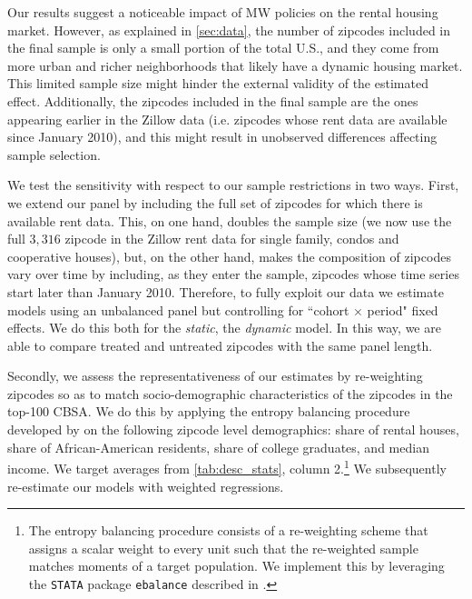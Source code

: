 Our results suggest a noticeable impact of MW policies on the rental housing market. However, as 
explained in \autoref{sec:data}, the number of zipcodes included in the final sample is only a 
small portion of the total U.S., and they come from more urban and richer neighborhoods that likely 
have a dynamic housing market. This limited sample size might hinder the external validity of the 
estimated effect. Additionally, the zipcodes included in the final sample are the ones appearing 
earlier in the Zillow data (i.e. zipcodes whose rent data are available since January 2010), and 
this might result in unobserved differences affecting sample selection.

We test the sensitivity with respect to our sample restrictions in two ways. First, we extend our 
panel by including the full set of zipcodes for which there is available rent data. This, on one 
hand, doubles the sample size (we now use the full $3,316$ zipcode in the Zillow rent data for 
single family, condos and cooperative houses), but, on the other hand, makes the composition of 
zipcodes vary over time by including, as they enter the sample, zipcodes whose time series start 
later than January 2010. Therefore, to fully exploit our data we estimate models using an unbalanced 
panel but controlling for ``cohort $\times$ period" fixed effects. We do this both for the \textit{static}, 
the \textit{dynamic} model. In this way, 
we are able to compare treated and untreated zipcodes with the same panel length.

Secondly, we assess the representativeness of our estimates by re-weighting zipcodes so as to match 
socio-demographic characteristics of the zipcodes in the top-100 CBSA. We do this by applying the 
entropy balancing procedure developed by \cite{hainmueller2012entropy} on the following zipcode 
level demographics: share of rental houses, share of African-American residents, share of college 
graduates, and median income. We target averages from \autoref{tab:desc_stats}, column 
2.\footnote{The entropy balancing procedure consists of a re-weighting scheme that assigns a scalar 
	weight to every unit such that the re-weighted sample matches moments of a target population. We 
	implement this by leveraging the \texttt{STATA} package \texttt{ebalance} described in 
	\textcite{hainmueller2013ebalance}.} We subsequently re-estimate our models with weighted regressions.


